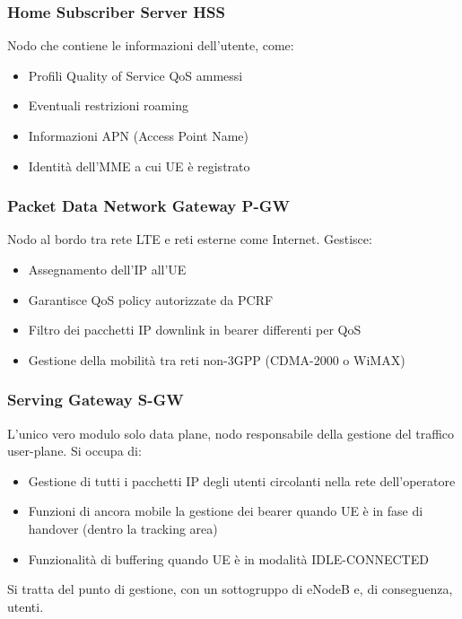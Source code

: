 \subsubsection{Home Subscriber Server HSS} 

Nodo che contiene le informazioni dell'utente, come: 
\begin{itemize}
	\item Profili Quality of Service QoS ammessi
	\item Eventuali restrizioni roaming
	\item Informazioni APN (Access Point Name)
	\item Identità dell'MME a cui UE è registrato
\end{itemize}

\subsubsection{Packet Data Network Gateway P-GW} 

Nodo al bordo tra rete LTE e reti esterne come Internet. Gestisce: 
\begin{itemize}
	\item Assegnamento dell'IP all'UE
	\item Garantisce QoS policy autorizzate da PCRF
	\item Filtro dei pacchetti IP downlink in bearer differenti per QoS
	\item Gestione della mobilità tra reti non-3GPP (CDMA-2000 o WiMAX)
\end{itemize}

\subsubsection{Serving Gateway S-GW} 

L'unico vero modulo solo data plane, nodo responsabile della gestione del traffico user-plane. Si occupa di:
\begin{itemize}
	\item Gestione di tutti i pacchetti IP degli utenti circolanti nella rete dell'operatore
	\item Funzioni di ancora mobile la gestione dei bearer quando UE è in fase di handover (dentro la tracking area)
	\item Funzionalità di buffering quando UE è in modalità IDLE-CONNECTED
\end{itemize}
Si tratta del punto di gestione, con un sottogruppo di eNodeB e, di conseguenza, utenti.

